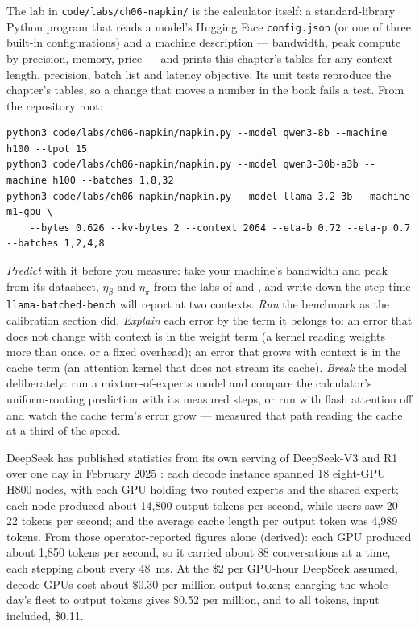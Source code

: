 
The lab in \texttt{code/labs/ch06-napkin/} is the calculator itself: a
standard-library Python program that reads a model's Hugging Face
\texttt{config.json} (or one of three built-in configurations) and a machine
description --- bandwidth, peak compute by precision, memory, price --- and prints
this chapter's tables for any context length, precision, batch list and latency
objective. Its unit tests reproduce the chapter's tables, so a change that moves
a number in the book fails a test. From the repository root:

\begin{Verbatim}[fontsize=\small]
python3 code/labs/ch06-napkin/napkin.py --model qwen3-8b --machine h100 --tpot 15
python3 code/labs/ch06-napkin/napkin.py --model qwen3-30b-a3b --machine h100 --batches 1,8,32
python3 code/labs/ch06-napkin/napkin.py --model llama-3.2-3b --machine m1-gpu \
    --bytes 0.626 --kv-bytes 2 --context 2064 --eta-b 0.72 --eta-p 0.7 --batches 1,2,4,8
\end{Verbatim}

\noindent \emph{Predict} with it before you measure: take your machine's
bandwidth and peak from its datasheet, $\eta_\beta$ and $\eta_\pi$ from the labs
of \Chref{roofline} and \Chref{prefill-decode}, and write down the step time
\texttt{llama-batched-bench} will report at two contexts. \emph{Run} the
benchmark as the calibration section did. \emph{Explain} each error by the term
it belongs to: an error that does not change with context is in the weight term
(a kernel reading weights more than once, or a fixed overhead); an error that
grows with context is in the cache term (an attention kernel that does not
stream its cache). \emph{Break} the model deliberately: run a mixture-of-experts
model and compare the calculator's uniform-routing prediction with its measured
steps, or run with flash attention off and watch the cache term's error grow ---
\Chref{prefill-decode} measured that path reading the cache at a third of the
speed.


DeepSeek has published statistics from its own serving of DeepSeek-V3 and R1
over one day in February 2025 \cite{deepseek2025inference}: each decode
instance spanned 18 eight-GPU H800 nodes, with each GPU holding two routed
experts and the shared expert; each node produced about 14,800 output tokens per
second, while users saw 20--22 tokens per second; and the average cache length
per output token was 4,989 tokens. From those operator-reported figures alone
(derived): each GPU produced about 1,850 tokens per second, so it carried about
88 conversations at a time, each stepping about every 48~ms. At the \$2 per
GPU-hour DeepSeek assumed, decode GPUs cost about \$0.30 per million output
tokens; charging the whole day's fleet to output tokens gives \$0.52 per
million, and to all tokens, input included, \$0.11.

